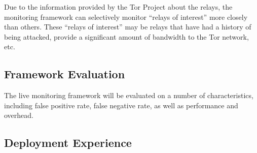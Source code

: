 Due to the information provided by the Tor Project about the relays, the monitoring framework can selectively monitor ``relays of interest'' more closely than others.  These ``relays of interest'' may be relays that have had a history of being attacked, provide a significant amount of bandwidth to the Tor network, etc.

\subsection{Framework Evaluation}
The live monitoring framework will be evaluated on a number of characteristics, including false positive rate, false negative rate, as well as performance and overhead.

\subsection{Deployment Experience}
